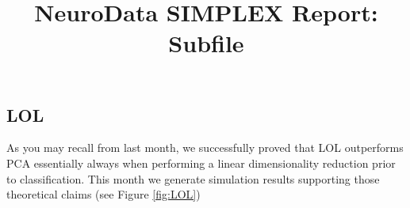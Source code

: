 \documentclass[simplex.tex]{subfiles}
\title{NeuroData SIMPLEX Report: Subfile}
\begin{document}
\onlyinsubfile{
\thispagestyle{empty}




\begin{spacing}{0.5}
\nocite{*}
{\footnotesize	}
\end{spacing}
}

\subsection{LOL}



As you may recall from last month, we successfully proved that LOL outperforms PCA essentially always when performing a linear dimensionality reduction prior to classification.  This month we generate simulation results supporting those theoretical claims (see Figure \ref{fig:LOL})
\end{document}
